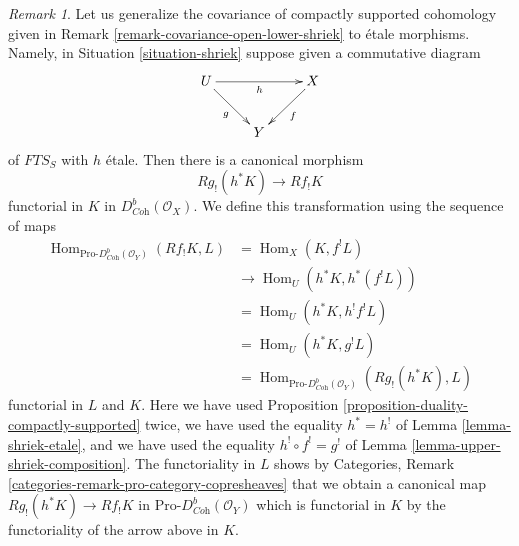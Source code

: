 \documentclass{stacks-project}
\theoremstyle{plain}
\theoremstyle{definition}
\theoremstyle{remark}
\newtheorem{remark}[subsection]{Remark}
\numberwithin{equation}{subsection}
\def\Hom{\mathop{\mathrm{Hom}}\nolimits}
\begin{document}
\begin{remark}
\label{remark-covariance-etale-lower-shriek}
Let us generalize the covariance of compactly supported cohomology
given in Remark \ref{remark-covariance-open-lower-shriek}
to \'etale morphisms. Namely, in Situation \ref{situation-shriek}
suppose given a commutative diagram
$$
\xymatrix{
U \ar[rr]_h \ar[rd]_g & & X \ar[ld]^f \\
& Y
}
$$
of $\textit{FTS}_S$ with $h$ \'etale. Then there is a canonical morphism
$$
Rg_!(h^*K) \longrightarrow Rf_!K
$$
functorial in $K$ in $D^b_{\textit{Coh}}(\mathcal{O}_X)$. We define
this transformation using the sequence of maps
\begin{align*}
\Hom_{\text{Pro-}D^b_{\textit{Coh}}(\mathcal{O}_Y)}(Rf_!K, L)
& =
\Hom_X(K, f^!L) \\
& \to
\Hom_U(h^*K, h^*(f^!L)) \\
& =
\Hom_U(h^*K, h^!f^!L) \\
& =
\Hom_U(h^*K, g^!L) \\
& =
\Hom_{\text{Pro-}D^b_{\textit{Coh}}(\mathcal{O}_Y)}(Rg_!(h^*K), L)
\end{align*}
functorial in $L$ and $K$. Here we have used
Proposition \ref{proposition-duality-compactly-supported}
twice, we have used the equality $h^* = h^!$ of
Lemma \ref{lemma-shriek-etale}, and we have used the equality
$h^! \circ f^! = g^!$ of Lemma \ref{lemma-upper-shriek-composition}.
The functoriality in $L$ shows by
Categories, Remark \ref{categories-remark-pro-category-copresheaves}
that we obtain a canonical map $Rg_!(h^*K) \to Rf_!K$ in
$\text{Pro-}D^b_{\textit{Coh}}(\mathcal{O}_Y)$ which is
functorial in $K$ by the functoriality of the arrow above in $K$.
\end{remark}
\end{document}
